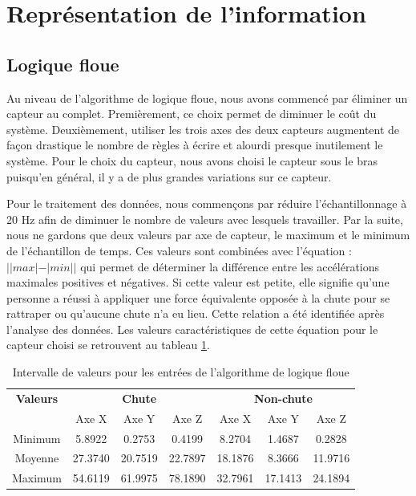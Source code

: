 \documentclass[12pt,letterpaper]{article}
\begin{document}
\section{Représentation de l'information}

\subsection{Logique floue}

Au niveau de l'algorithme de logique floue, nous avons commencé par éliminer un capteur au complet. Premièrement, ce choix permet de diminuer le coût du système. Deuxièmement, utiliser les trois axes des deux capteurs augmentent de façon drastique le nombre de règles à écrire et alourdi presque inutilement le système. Pour le choix du capteur, nous avons choisi le capteur sous le bras puisqu'en général, il y a de plus grandes variations sur ce capteur.

Pour le traitement des données, nous commençons par réduire l'échantillonnage à 20 Hz afin de diminuer le nombre de valeurs avec lesquels travailler. Par la suite, nous ne gardons que deux valeurs par axe de capteur, le maximum et le minimum de l'échantillon de temps. Ces valeurs sont combinées avec l'équation : $||max|-|min||$ qui permet de déterminer la différence entre les accélérations maximales positives et négatives. Si cette valeur est petite, elle signifie qu'une personne a réussi à appliquer une force équivalente opposée à la chute pour se rattraper ou qu'aucune chute n'a eu lieu. Cette relation a été identifiée après l'analyse des données. Les valeurs caractéristiques de cette équation pour le capteur choisi se retrouvent au tableau \ref{tbl:f_input_val}.

\begin{table}[h]
  \begin{center}
    \begin{tabular} {|c|c|c|c|c|c|c|}
        \hline
        \textbf{Valeurs} & \multicolumn{3}{|c|}{\textbf{Chute}} & \multicolumn{3}{|c|}{\textbf{Non-chute}} \\ \cline{2-7}
         & Axe X & Axe Y & Axe Z & Axe X & Axe Y & Axe Z \\
        \hline
        Minimum & 5.8922  & 0.2753  & 0.4199  & 8.2704  & 1.4687  & 0.2828 \\
        \hline
        Moyenne & 27.3740 & 20.7519 & 22.7897 & 18.1876 & 8.3666  & 11.9716 \\
        \hline
        Maximum & 54.6119 & 61.9975 & 78.1890 & 32.7961 & 17.1413 & 24.1894 \\
        \hline
    \end{tabular}
    \caption{Intervalle de valeurs pour les entrées de l'algorithme de logique floue}
    \label{tbl:f_input_val}
  \end{center}
\end{table}
\end{document}
